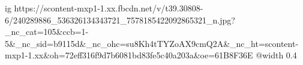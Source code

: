  
 
 
 
 

\ifcmt
  ig https://scontent-mxp1-1.xx.fbcdn.net/v/t39.30808-6/240289886_536326134343721_7578185422092865321_n.jpg?_nc_cat=105&ccb=1-5&_nc_sid=b9115d&_nc_ohc=su8Kh4tTYZoAX9cmQ2A&_nc_ht=scontent-mxp1-1.xx&oh=72eff316f9d7b6081bd83fe5c40a203a&oe=61B8F36E
  @width 0.4
\fi
